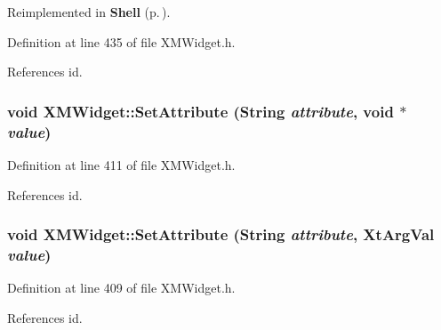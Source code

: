 Reimplemented in {\bf Shell} {\rm (p.\,\pageref{classShell_a8})}.

Definition at line 435 of file XMWidget.h.

References id.
\subsubsection{\setlength{\rightskip}{0pt plus 5cm}void XMWidget::Set\-Attribute (String {\em attribute}, void $\ast$ {\em value})\hspace{0.3cm}{\tt  [inline]}}\label{classXMWidget_a10}




Definition at line 411 of file XMWidget.h.

References id.
\subsubsection{\setlength{\rightskip}{0pt plus 5cm}void XMWidget::Set\-Attribute (String {\em attribute}, Xt\-Arg\-Val {\em value})\hspace{0.3cm}{\tt  [inline]}}\label{classXMWidget_a9}




Definition at line 409 of file XMWidget.h.

References id.


